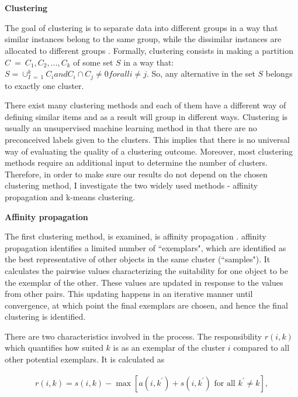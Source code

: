 \documentclass[a4paper,12pt]{article}
\begin{document}
\newpage
\section{}\label{appendix:clusteringAlgorithms}

\textbf{Clustering}

The goal of clustering is to separate data into different groups in a way that similar instances belong to the same group, while the dissimilar instances are allocated to different groups \citep{maimon2005data}. Formally, clustering consists in making a partition $C\ =\ {C_1,C_2,\ldots,C_k}$ of some set $S$ in a way that: $S=\cup_{I\ =\ 1}^kC_i and C_i\cap C_j\neq0 for all i\neq j$. So, any alternative in the set $S$ belongs to exactly one cluster.

There exist many clustering methods and each of them have a different way of defining similar items and as a result will group in different ways. Clustering is usually an unsupervised machine learning method in that there are no preconceived labels given to the clusters. This implies that there is no universal way of evaluating the quality of a clustering outcome. Moreover, most clustering methods require an additional input to determine the number of clusters.  Therefore, in order to make sure our results do not depend on the chosen clustering method, I investigate the two widely used methods - affinity propagation and k-means clustering.

\textbf{Affinity propagation}

The first clustering method, is examined, is affinity propagation \citep{freyDueck07}. affinity propagation identifies a limited number of ``exemplars", which are identified as the best representative of other objects in the same cluster (``samples"). It calculates the pairwise values characterizing the suitability for one object to be the exemplar of the other. These values are updated in response to the values from other pairs. This updating happens in an iterative manner until convergence, at which point the final exemplars are chosen, and hence the final clustering is identified.

There are two characteristics involved in the process. The responsibility $r\left(i,k\right)$ which quantifies how suited $k$ is as an exemplar of the cluster $i$ compared to all other potential exemplars. It is calculated as

\begin{align}\label{eq:affinityPropagationExemplars}
    r\left(i,k\right) = s\left(i,k\right) - \max\left[a\left(i,k^\prime\right) + s\left(i,k^\prime\right) \text{ for all } k^\prime \neq k\right],
\end{align}
\end{document}
